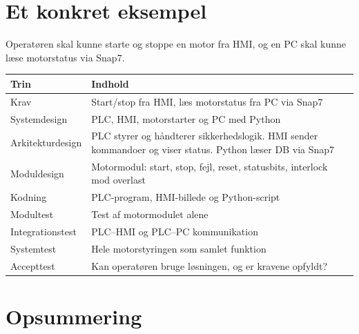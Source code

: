 \documentclass[12pt, a4paper]{article}
\begin{document}
\section{Et konkret eksempel}

\begin{tcolorbox}[infobox, title={\faInfoCircle\quad Opgaven}]
Operatøren skal kunne starte og stoppe en motor fra HMI, og en PC skal kunne læse motorstatus via Snap7.
\end{tcolorbox}

\vspace{0.3cm}

\begin{center}
\begin{tabular}{lp{9.5cm}}
\toprule
\textbf{Trin} & \textbf{Indhold} \\
\midrule
Krav          & Start/stop fra HMI, læs motorstatus fra PC via Snap7 \\[4pt]
Systemdesign  & PLC, HMI, motorstarter og PC med Python \\[4pt]
Arkitekturdesign & PLC styrer og håndterer sikkerhedslogik. HMI sender kommandoer og viser status. Python læser DB via Snap7 \\[4pt]
Moduldesign   & Motormodul: start, stop, fejl, reset, statusbits, interlock mod overlast \\[4pt]
Kodning       & PLC-program, HMI-billede og Python-script \\[4pt]
Modultest     & Test af motormodulet alene \\[4pt]
Integrationstest & PLC–HMI og PLC–PC kommunikation \\[4pt]
Systemtest    & Hele motorstyringen som samlet funktion \\[4pt]
Accepttest    & Kan operatøren bruge løsningen, og er kravene opfyldt? \\
\bottomrule
\end{tabular}
\end{center}

\section{Opsummering}
\end{document}
